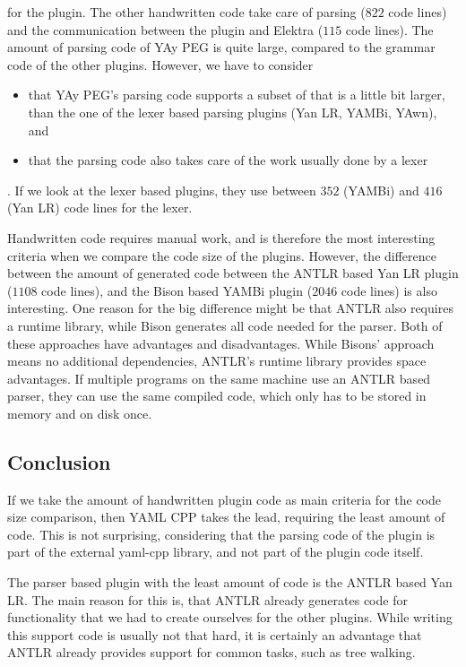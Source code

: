 for the plugin. The other handwritten code take care of parsing ($822$ code lines) and the communication between the plugin and Elektra ($115$ code lines). The amount of parsing code of YAy PEG is quite large, compared to the grammar code of the other plugins. However, we have to consider

\begin{itemize}
  \item that YAy PEG’s parsing code supports a subset of  that is a little bit larger, than the one of the lexer based parsing plugins (Yan LR, YAMBi, YAwn), and
  \item that the parsing code also takes care of the work usually done by a lexer
\end{itemize}

. If we look at the lexer based plugins, they use between $352$ (YAMBi) and $416$ (Yan LR) code lines for the lexer.

Handwritten code requires manual work, and is therefore the most interesting criteria when we compare the code size of the plugins. However, the difference between the amount of generated code between the ANTLR based Yan LR plugin ($1108$ code lines), and the Bison based YAMBi plugin ($2046$ code lines) is also interesting. One reason for the big difference might be that ANTLR also requires a runtime library, while Bison generates all code needed for the parser. Both of these approaches have advantages and disadvantages. While Bisons’ approach means no additional dependencies, ANTLR’s runtime library provides space advantages. If multiple programs on the same machine use an ANTLR based parser, they can use the same compiled code, which only has to be stored in memory and on disk once.

\subsection{Conclusion}

If we take the amount of handwritten plugin code as main criteria for the code size comparison, then YAML CPP takes the lead, requiring the least amount of code. This is not surprising, considering that the parsing code of the plugin is part of the external yaml-cpp library, and not part of the plugin code itself.

The parser based plugin with the least amount of code is the ANTLR based Yan LR. The main reason for this is, that ANTLR already generates code for functionality that we had to create ourselves for the other plugins. While writing this support code is usually not that hard, it is certainly an advantage that ANTLR already provides support for common tasks, such as tree walking.

